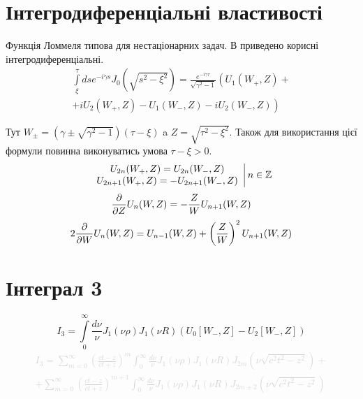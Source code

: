 \section{Інтегродиференціальні властивості}

Функція Ломмеля типова для нестаціонарних задач. В \cite[ст. 41]{Borisov1991} 
приведено корисні інтегродиференціальні.
%
\begin{equation} \begin{aligned}
\int \limits_{\xi}^{\tau} ds e^{-i \gamma s} J_0(\sqrt{s^2 - \xi^2 }) = 
\frac{e^{-i \gamma \tau}}{\sqrt{\gamma^2 - 1}} \left( U_1(W_+,Z) + \right. \\ 
\left. + i U_2(W_+,Z) - U_1(W_-,Z) - i U_2(W_-,Z) \right)
\end{aligned} \end{equation}

Тут $ W_\pm = (\gamma \pm \sqrt{\gamma^2 - 1}) (\tau - \xi) $ a 
$ Z = \sqrt{\tau^2 - \xi^2} $. Також для використання цієї формули повинна
виконуватись умова $ \tau - \xi > 0 $.
%
\textcolor{red}{ \begin{equation}
\left. \begin{array}{c}
U_{2n} (W_+, Z) = U_{2n} (W_-, Z) \\
U_{2n+1} (W_+, Z) = - U_{2n+1} (W_-, Z)
\end{array} \right| n \in \mathbb{Z}
\end{equation} }
%
\begin{equation} 
\frac{\partial }{\partial Z} U_n (W,Z) = - \frac{Z}{W} U_{n+1} (W,Z)
\end{equation}
%
\begin{equation}
2 \frac{\partial }{\partial W} U_n (W,Z) = U_{n-1} (W,Z) + 
\left( \frac{Z}{W} \right)^2 U_{n+1} (W,Z)
\end{equation}

\section{Інтеграл 3}

\begin{equation}
I_3 = \int \limits_{0}^{\infty} \frac{d \nu}{\nu} J_1(\nu \rho) J_1(\nu R) 
(U_0[ W_-, Z ] - U_2[ W_-, Z ])
\end{equation}
%
\textcolor{lightgray}{ \begin{equation*} \begin{aligned}
I_3 =  \sum \limits_{m = 0}^{\infty} \left( \frac{ct-z}{ct+z} \right)^m 
\int_{0}^{\infty} \frac{d \nu}{\nu} J_1(\nu \rho) J_1(\nu R) 
J_{2m} \left (\nu \sqrt{c^2t^2-z^2} \right) + \\ + \sum \limits_{m = 0}^{\infty} 
\left( \frac{ct-z}{ct+z} \right)^{m+1} \int_{0}^{\infty}
\frac{d \nu}{\nu} J_1(\nu \rho) J_1(\nu R) 
J_{2m+2} \left (\nu \sqrt{c^2t^2-z^2} \right)
\end{aligned} \end{equation*} }

